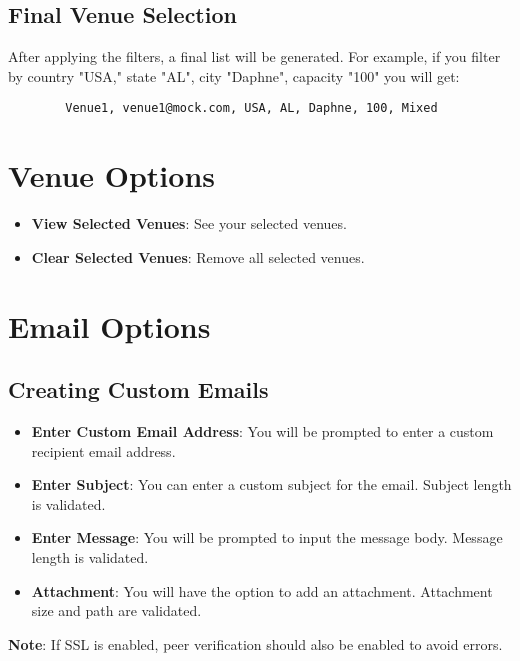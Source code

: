 \documentclass{article}
\begin{document}
	\subsection{Final Venue Selection}
	
	After applying the filters, a final list will be generated. For example, if you filter by country "USA," state "AL", city "Daphne", capacity "100" you will get:
	
	\begin{verbatim}
		Venue1, venue1@mock.com, USA, AL, Daphne, 100, Mixed
	\end{verbatim}
	
	\section{Venue Options}
	
	\begin{itemize}
		\item \textbf{View Selected Venues}: See your selected venues.
		\item \textbf{Clear Selected Venues}: Remove all selected venues.
	\end{itemize}
	
	\section{Email Options}
	
	\subsection{Creating Custom Emails}
	
	\begin{itemize}
		\item \textbf{Enter Custom Email Address}: You will be prompted to enter a custom recipient email address.
		\item \textbf{Enter Subject}: You can enter a custom subject for the email. Subject length is validated.
		\item \textbf{Enter Message}: You will be prompted to input the message body. Message length is validated.
		\item \textbf{Attachment}: You will have the option to add an attachment. Attachment size and path are validated.
	\end{itemize}
	
	\textbf{Note}: If SSL is enabled, peer verification should also be enabled to avoid errors.
	
\end{document}
